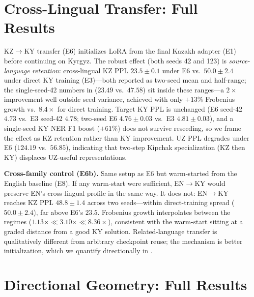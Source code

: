 \documentclass[11pt]{article}
\begin{document}
\section{Cross-Lingual Transfer: Full Results}
\label{app:transfer}

KZ$\rightarrow$KY transfer (E6) initializes LoRA from the final Kazakh adapter (E1) before continuing on Kyrgyz. The robust effect (both seeds 42 and 123) is \emph{source-language retention}: cross-lingual KZ PPL $23.5 \pm 0.1$ under E6 vs.\ $50.0 \pm 2.4$ under direct KY training (E3)---both reported as two-seed mean and half-range; the single-seed-42 numbers in  ($23.49$ vs.\ $47.58$) sit inside these ranges---a $2\times$ improvement well outside seed variance, achieved with only $+13\%$ Frobenius growth vs.\ $8.4\times$ for direct training. Target KY PPL is unchanged (E6 seed-42 $4.73$ vs.\ E3 seed-42 $4.78$; two-seed E6 $4.76 \pm 0.03$ vs.\ E3 $4.81 \pm 0.03$), and a single-seed KY NER F1 boost ($+61\%$) does not survive reseeding, so we frame the effect as KZ retention rather than KY improvement. UZ PPL degrades under E6 ($124.19$ vs.\ $56.85$), indicating that two-step Kipchak specialization (KZ then KY) displaces UZ-useful representations.

\textbf{Cross-family control (E6b).} Same setup as E6 but warm-started from the English baseline (E8). If any warm-start were sufficient, EN$\rightarrow$KY would preserve EN's cross-lingual profile in the same way. It does not: EN$\rightarrow$KY reaches KZ PPL $48.8 \pm 1.4$ across two seeds---within direct-training spread ($50.0 \pm 2.4$), far above E6's $23.5$. Frobenius growth interpolates between the regimes ($1.13\times \ll 3.10\times \ll 8.36\times$), consistent with the warm-start sitting at a graded distance from a good KY solution. Related-language transfer is qualitatively different from arbitrary checkpoint reuse; the mechanism is better initialization, which we quantify directionally in .

\section{Directional Geometry: Full Results}
\label{app:directional_extra}
\end{document}
